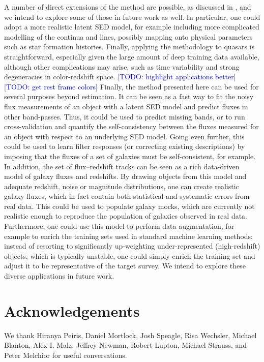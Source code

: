 \documentclass[aps,prd,showpacs,superscriptaddress,groupedaddress]{revtex4}  %
\newcommand{\todo}[1]{\textcolor{blue}{[TODO: #1]}}
\begin{document}
A number of direct extensions of the method are possible, as discussed in , and we intend to explore some of those in future work as well.
In particular, one could adopt a more realistic latent SED model, for example including more complicated modelling of the continua and lines, possibly mapping onto physical parameters such as star formation histories.
Finally, applying the methodology to quasars is straightforward, especially given the large amount of deep training data available, although other complications may arise, such as time variability and strong degeneracies in color-redshift space. 
\todo{highlight applications better}
\todo{get rest frame colors}
Finally, the method presented here can be used for several purposes beyond \photoz estimation. 
It can be seen as a fast way to fit the noisy flux measurements of an object with a latent SED model and predict fluxes in other band-passes.
Thus, it could be used to predict missing bands, or to run cross-validation and quantify the self-consistency between the fluxes measured for an object with respect to an underlying SED model.
Going even further, this could be used to learn filter responses (or correcting existing descriptions) by imposing that the fluxes of a set of galaxies must be self-consistent, for example.
In addition, the set of flux--redshift tracks can be seen as a rich data-driven model of galaxy fluxes and redshifts. 
By drawing objects from this model and adequate redshift, noise or magnitude distributions, one can create realistic galaxy fluxes, which in fact contain both statistical and systematic errors from real data.
This could be used to populate galaxy mocks, which are currently not realistic enough to reproduce the population of galaxies observed in real data.
Furthermore, one could use this model to perform data augmentation, for example to enrich the training sets used in standard machine learning methods; instead of resorting to significantly up-weighting under-represented (\eg high-redshift) objects, which is typically unstable, one could simply enrich the training set and adjust it to be representative of the target survey. 
We intend to explore these diverse applications in future work.



\section{Acknowledgements}

We thank Hiranya Peiris, Daniel Mortlock, Josh Speagle, Risa Wechsler, Michael Blanton, Alex I. Malz, Jeffrey Newman, Robert Lupton, Michael Strauss, and Peter Melchior for useful conversations.
\end{document}
